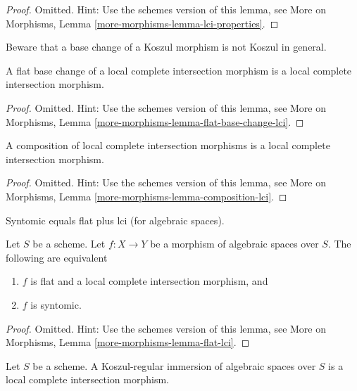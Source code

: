\begin{proof}
Omitted. Hint: Use the schemes version of this lemma, see
More on Morphisms,
Lemma \ref{more-morphisms-lemma-lci-properties}.
\end{proof}

\noindent
Beware that a base change of a Koszul morphism is not Koszul in general.

\begin{lemma}
\label{lemma-flat-base-change-lci}
A flat base change of a local complete intersection morphism is a
local complete intersection morphism.
\end{lemma}

\begin{proof}
Omitted. Hint: Use the schemes version of this lemma, see
More on Morphisms,
Lemma \ref{more-morphisms-lemma-flat-base-change-lci}.
\end{proof}

\begin{lemma}
\label{lemma-composition-lci}
A composition of local complete intersection morphisms is a
local complete intersection morphism.
\end{lemma}

\begin{proof}
Omitted. Hint: Use the schemes version of this lemma, see
More on Morphisms,
Lemma \ref{more-morphisms-lemma-composition-lci}.
\end{proof}

\begin{lemma}
\label{lemma-flat-lci}
\begin{slogan}
Syntomic equals flat plus lci (for algebraic spaces).
\end{slogan}
Let $S$ be a scheme.
Let $f : X \to Y$ be a morphism of algebraic spaces over $S$.
The following are equivalent
\begin{enumerate}
\item $f$ is flat and a local complete intersection morphism, and
\item $f$ is syntomic.
\end{enumerate}
\end{lemma}

\begin{proof}
Omitted. Hint: Use the schemes version of this lemma, see
More on Morphisms,
Lemma \ref{more-morphisms-lemma-flat-lci}.
\end{proof}

\begin{lemma}
\label{lemma-regular-immersion-lci}
Let $S$ be a scheme. A Koszul-regular immersion of algebraic spaces
over $S$ is a local complete intersection morphism.
\end{lemma}

